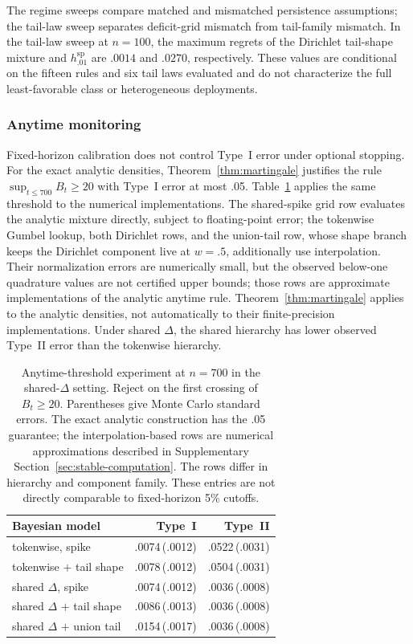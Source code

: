 \documentclass[11pt]{article}
\newcommand{\mcse}[2]{\mbox{#1\,{\fontsize{7}{8}\selectfont(#2)}}}
\begin{document}
The regime sweeps compare matched and mismatched persistence assumptions; the tail-law sweep separates deficit-grid mismatch from tail-family mismatch.  In the tail-law sweep at $n=100$, the maximum regrets of the Dirichlet tail-shape mixture and $h^{\mathrm{sp}}_{.01}$ are $.0014$ and $.0270$, respectively.  These values are conditional on the fifteen rules and six tail laws evaluated and do not characterize the full least-favorable class or heterogeneous deployments.

\FloatBarrier
\subsubsection{Anytime monitoring}
\label{sec:anytime-monitoring}

Fixed-horizon calibration does not control Type~I error under optional stopping.  For the exact analytic densities, Theorem~\ref{thm:martingale} justifies the rule $\sup_{t\le700}B_t\ge20$ with Type~I error at most .05.  Table~\ref{tab:anytime} applies the same threshold to the numerical implementations.  The shared-spike grid row evaluates the analytic mixture directly, subject to floating-point error; the tokenwise Gumbel lookup, both Dirichlet rows, and the union-tail row, whose shape branch keeps the Dirichlet component live at $w=.5$, additionally use interpolation.  Their normalization errors are numerically small, but the observed below-one quadrature values are not certified upper bounds; those rows are approximate implementations of the analytic anytime rule.  Theorem~\ref{thm:martingale} applies to the analytic densities, not automatically to their finite-precision implementations.  Under shared $\Delta$, the shared hierarchy has lower observed Type~II error than the tokenwise hierarchy.

\begin{table}[htbp]
\centering
\caption{Anytime-threshold experiment at $n=700$ in the shared-$\Delta$ setting.  Reject on the first crossing of $B_t\ge20$.  Parentheses give Monte Carlo standard errors.  The exact analytic construction has the .05 guarantee; the interpolation-based rows are numerical approximations described in Supplementary Section~\ref{sec:stable-computation}.  The rows differ in hierarchy and component family.  These entries are not directly comparable to fixed-horizon 5\% cutoffs.}
\label{tab:anytime}
\begin{tabular}{@{}lrr@{}}
\toprule
Bayesian model & Type~I & Type~II \\
\midrule
tokenwise, spike & \mcse{.0074}{.0012} & \mcse{.0522}{.0031} \\
tokenwise $+$ tail shape & \mcse{.0078}{.0012} & \mcse{.0504}{.0031} \\
shared $\Delta$, spike & \mcse{.0074}{.0012} & \mcse{.0036}{.0008} \\
shared $\Delta$ $+$ tail shape & \mcse{.0086}{.0013} & \mcse{.0036}{.0008} \\
shared $\Delta$ $+$ union tail & \mcse{.0154}{.0017} & \mcse{.0036}{.0008} \\
\bottomrule
\end{tabular}
\end{table}
\end{document}
